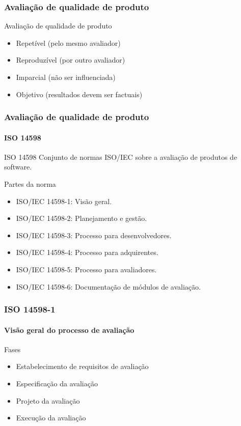 \begin{frame}[parent={ie:agenda}, hasnext=false, hasprev=false]
	\frametitle{Avaliação de qualidade de produto}

	\begin{block:fact}{Avaliação de qualidade de produto}
		\begin{itemize}
		 \item Repetível (pelo mesmo avaliador)
		 \item Reproduzível (por outro avaliador)
		 \item Imparcial (não ser influenciada)
		 \item Objetivo (resultados devem ser factuais)
		\end{itemize}
	\end{block:fact}
\end{frame}



\begin{frame}[hasnext=true, hasprev=true]
	\frametitle{Avaliação de qualidade de produto}
	\framesubtitle{ISO 14598}

	\begin{block:concept}{ISO 14598}
		Conjunto de normas ISO/IEC sobre a avaliação de produtos de software.
	\end{block:concept}
	
	\begin{block:fact}{Partes da norma}
		\begin{itemize}
			\item ISO/IEC 14598-1: Visão geral.
			\item ISO/IEC 14598-2: Planejamento e gestão.
			\item ISO/IEC 14598-3: Processo para desenvolvedores.
			\item ISO/IEC 14598-4: Processo para adquirentes.
			\item ISO/IEC 14598-5: Processo para avaliadores.
			\item ISO/IEC 14598-6: Documentação de módulos de avaliação.
		\end{itemize}
	\end{block:fact}
	
\end{frame}

\begin{frame}
	\frametitle{ISO 14598-1}
	\framesubtitle{Visão geral do processo de avaliação}

	\begin{block:fact}{Fases}
		\begin{itemize}
			\item Estabelecimento de requisitos de avaliação
			\item Especificação da avaliação
			\item Projeto da avaliação
			\item Execução da avaliação
		\end{itemize}
	\end{block:fact}
\end{frame}


